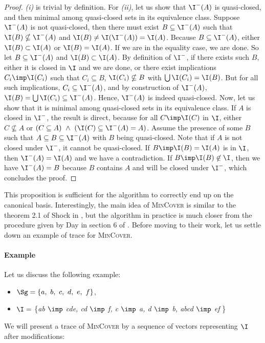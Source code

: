 \begin{proof} \textit{(i)} is trivial by definition. For \textit{(ii)}, let us
show that $\I^{-}(A)$ is quasi-closed, and then minimal among quasi-closed 
sets in its equivalence class. Suppose $\I^{-}(A)$ is not quasi-closed, then 
there must exist $B \subseteq \I^{-}(A)$ such that $\I(B) \nsubseteq \I^{-}(A)$ 
and $\I(B) \neq \I(\I^{-}(A)) = \I(A)$. Because $B \subseteq \I^{-}(A)$, either 
$\I(B) \subset \I(A)$ or $\I(B) = \I(A)$. If we are in the equality case, 
we are done. So let $B \subseteq \I^{-}(A)$ and $\I(B) \subset \I(A)$. By 
definition of $\I^{-}$, if there exists such $B$, either it is closed in 
$\I$ and we are done, or there exist implications $C_i \imp \I(C_i)$ such that 
$C_i \subseteq B$, $\I(C_i) \nsubseteq B$ with $\bigcup \I(C_i) = \I(B)$. But 
for all such implications, $C_i \subseteq \I^{-}(A)$, and by construction of 
$\I^{-}(A)$, $\I(B) = \bigcup \I(C_i) \subseteq \I^{-}(A)$. Hence, 
$\I^{-}(A)$ is indeed quasi-closed. Now, let us show that it is minimal among 
quasi-closed sets in its equivalence class. If $A$ is closed in $\I^{-}$, the 
result is direct, because for all $C \imp \I(C)$ in $\I$, either $C \nsubseteq 
A$ or $(C \subseteq A) \ \land \ (\I(C) \subseteq \I^{-}(A) = A)$. Assume the 
presence of some $B$ such that $A \subseteq B \subseteq \I^{-}(A)$ with $B$ 
being quasi-closed. Note that if $A$ is not closed under $\I^{-}$, it
cannot be quasi-closed. If $B \imp \I(B) = \I(A)$ is in $\I$, then 
$\I^{-}(A) = \I(A)$ and we have a contradiction. If $B \imp \I(B) \not\in \I$, 
then we have $\I^{-}(A) = B$ because $B$ contains $A$ and will be closed under 
$\I^{-}$, which concludes the proof.
\end{proof}

\vspace{1.2em}

This proposition is sufficient for the algorithm to correctly end up on the 
canonical basis. Interestingly, the main idea of \textsc{MinCover} is similar to
the theorem 2.1 of Shock in \cite{shock_computing_1986}, but the algorithm in
practice is much closer from the procedure given by Day in section 6 of 
\cite{day_lattice_1992}. Before moving to their work, let us settle down an 
example of trace for \textsc{MinCover}.

\vspace{1.2em}

\paragraph{Example} Let us discuss the following example:
\begin{itemize}
	\item $\Sg = \{a, \ b, \ c, \ d, \ e, \ f \}$,
	\item $\I =$ \{\textit{ab $\imp$ cde, cd $\imp$ f, c $\imp$ a, d $\imp$ b, 
		abcd $\imp$ ef} \} 
\end{itemize}
We will present a trace of \textsc{MinCover} by a sequence of vectors 
representing $\I$ after modifications:

